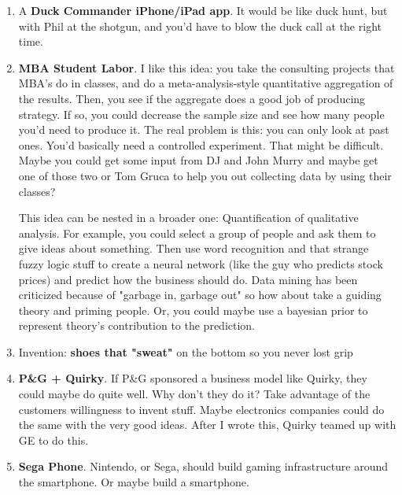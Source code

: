 \documentclass[paper=a4, fontsize=11pt]{scrartcl} %
\numberwithin{equation}{section} %
\numberwithin{figure}{section} %
\numberwithin{table}{section} %
\begin{document}
\begin{enumerate}
\item A \textbf{Duck Commander iPhone/iPad app}.  It would be like duck hunt, but with Phil at the shotgun, and you'd have to blow the duck call at the right time.


\item \textbf{MBA Student Labor}.  I like this idea: you take the consulting projects that MBA's do in classes, and do a meta-analysis-style quantitative aggregation of the results.  Then, you see if the aggregate does a good job of producing strategy.  If so, you could decrease the sample size and see how many people you'd need to produce it.  The real problem is this: you can only look at past ones.  You'd basically need a controlled experiment.  That might be difficult.  Maybe you could get some input from DJ and John Murry and maybe get one of those two or Tom Gruca to help you out collecting data by using their classes?

This idea can be nested in a broader one: Quantification of qualitative analysis.  For example, you could select a group of people and ask them to give ideas about something.  Then use word recognition and that strange fuzzy logic stuff to create a neural network (like the guy who predicts stock prices) and predict how the business should do.  Data mining has been criticized because of "garbage in, garbage out" so how about take a guiding theory and priming people.  Or, you could maybe use a bayesian prior to represent theory's contribution to the prediction. 

\item Invention: \textbf{shoes that "sweat"} on the bottom so you never lost grip

\item \textbf{P\&G + Quirky}.  If P\&G sponsored a business model like Quirky, they could maybe do quite well.  Why don't they do it?  Take advantage of the customers willingness to invent stuff.  Maybe electronics companies could do the same with the very good ideas.  After I wrote this, Quirky teamed up with GE to do this.

\item \textbf{Sega Phone}.  Nintendo, or Sega, should build gaming infrastructure around the smartphone.  Or maybe build a smartphone.


\end{enumerate}
\end{document}
